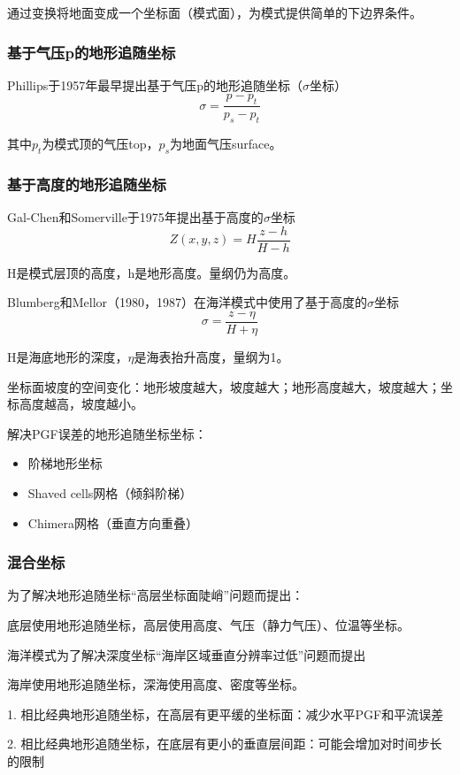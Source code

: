 \documentclass{article}
\begin{document}
通过变换将地面变成一个坐标面（模式面），为模式提供简单的下边界条件。
\subsubsection{基于气压p的地形追随坐标}
Phillips于1957年最早提出基于气压p的地形追随坐标（$\sigma$坐标）
$$\sigma = \frac{p-p_t}{p_s-p_t}$$

其中$p_t$为模式顶的气压top，$p_s$为地面气压surface。

\subsubsection{基于高度的地形追随坐标}
Gal-Chen和Somerville于1975年提出基于高度的$\sigma$坐标
$$Z(x,y,z) = H\frac{z-h}{H-h}$$

H是模式层顶的高度，h是地形高度。量纲仍为高度。

Blumberg和Mellor（1980，1987）在海洋模式中使用了基于高度的$\sigma$坐标
$$\sigma = \frac{z-\eta}{H+\eta}$$

H是海底地形的深度，$\eta$是海表抬升高度，量纲为1。

坐标面坡度的空间变化：地形坡度越大，坡度越大；地形高度越大，坡度越大；坐标高度越高，坡度越小。

解决PGF误差的地形追随坐标坐标：
\begin{itemize}
    \item 阶梯地形坐标
    \item Shaved cells网格（倾斜阶梯）
    \item Chimera网格（垂直方向重叠）
\end{itemize}

\subsubsection{混合坐标}
为了解决地形追随坐标“高层坐标面陡峭”问题而提出：

底层使用地形追随坐标，高层使用高度、气压（静力气压）、位温等坐标。

海洋模式为了解决深度坐标“海岸区域垂直分辨率过低”问题而提出

海岸使用地形追随坐标，深海使用高度、密度等坐标。

1. 相比经典地形追随坐标，在高层有更平缓的坐标面：减少水平PGF和平流误差

2. 相比经典地形追随坐标，在底层有更小的垂直层间距：可能会增加对时间步长的限制
\end{document}
